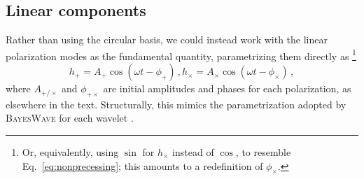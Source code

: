 \documentclass[aps,prd,twocolumn,superscriptaddress,preprintnumbers,floatfix,nofootinbib]{revtex4-2}
\newcommand*{\eq}[1]{Eq.~\eqref{eq:#1}}
\begin{document}
\subsection{Linear components}
\label{sec:jac:Apc}

Rather than using the circular basis, we could instead work with the linear polarization modes as the fundamental quantity, parametrizing them directly as%
\footnote{Or, equivalently, using $\sin$ for $h_\times$ instead of $\cos$, to resemble \eq{nonprecessing}; this amounts to a redefinition of $\phi_\times$.}
\begin{subequations} \label{eq:Aphi}
\begin{equation}
h_+ = A_+ \cos (\omega t - \phi_+)\, ,
\end{equation}
\begin{equation}
h_\times = A_\times \cos (\omega t - \phi_\times) \, ,
\end{equation}
\end{subequations}
where $A_{+/\times}$ and $\phi_{+\times}$ are initial amplitudes and phases for each polarization, as elsewhere in the text.
Structurally, this mimics the parametrization adopted by \textsc{BayesWave} for each wavelet \cite{Cornish:2020dwh}.

\newcommand{\xp}{x_{+}}
\newcommand{\xc}{x_{\times}}
\newcommand{\xpc}{x_{+/\times}}
\newcommand{\yp}{y_{+}}
\newcommand{\yc}{y_{\times}}
\newcommand{\ypc}{y_{+/\times}}

\newcommand{\xr}{x_{R}}
\newcommand{\xl}{x_{L}}
\newcommand{\xrl}{x_{R/L}}
\newcommand{\yr}{y_{R}}
\newcommand{\yl}{y_{L}}
\newcommand{\yrl}{y_{R/L}}

\end{document}
